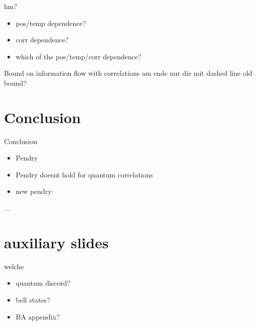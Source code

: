 \documentclass[10pt]{beamer}
\begin{document}
\begin{frame}{hm?}
    \begin{itemize}
        \item pos/temp dependence?
        \item corr dependence?
        \item which of the pos/temp/corr dependence?
    \end{itemize}
\end{frame}

\begin{frame}{Bound on information flow with correlations}
    am ende nur die mit dashed line old bound?
\end{frame}

\section[Conclusion and Outlook]{Conclusion}

\begin{frame}{Conclusion}
    \begin{itemize}
        \item Pendry
        \item Pendry doesnt hold for quantum correlations
        \item new pendry:
    \end{itemize}
    ...
\end{frame}

\appendix

\begin{frame}
    \printbibliography    
\end{frame}

\section*{auxiliary slides}

\begin{frame}{welche}
    \begin{itemize}
        \item quantum discord?
        \item bell states?
        \item BA appendix?
    \end{itemize}
\end{frame}
\end{document}
